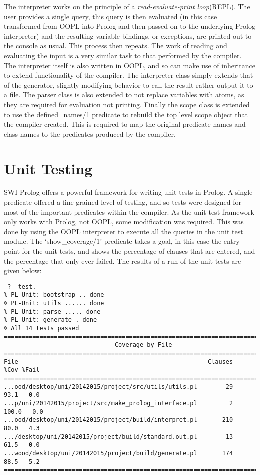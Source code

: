 \documentclass[12pt,a4paper,twoside,openright]{report}
\begin{document}
\bigskip

The interpreter works on the principle of a \emph{read-evaluate-print loop}(REPL). The user provides a single query, this query is then evaluated (in this case transformed from OOPL into Prolog and then passed on to the underlying Prolog interpreter) and the resulting variable bindings, or exceptions, are printed out to the console as usual. This process then repeats. The work of reading and evaluating the input is a very similar task to that performed by the compiler. The interpreter itself is also written in OOPL, and so can make use of inheritance to extend functionality of the compiler. The interpreter class simply extends that of the generator, slightly modifying behavior to call the result rather output it to a file. The parser class is also extended to not replace variables with atoms, as they are required for evaluation not printing. Finally the scope class is extended to use the defined_names/1 predicate to rebuild the top level scope object that the compiler created. This is required to map the original predicate names and class names to the predicates produced by the compiler.

\section{Unit Testing}

SWI-Prolog offers a powerful framework for writing unit tests in Prolog. A single predicate offered a fine-grained level of testing, and so tests were designed for most of the important predicates within the compiler. As the unit test framework only works with Prolog, not OOPL, some modification was required. This was done by using the OOPL interpreter to execute all the queries in the unit test module. The `show_coverage/1' predicate takes a goal, in this case the entry point for the unit tests, and shows the percentage of clauses that are entered, and the percentage that only ever failed. The results of a run of the unit tests are given below:
 
 \begin{verbatim}
 ?- test.
% PL-Unit: bootstrap .. done
% PL-Unit: utils ...... done
% PL-Unit: parse ..... done
% PL-Unit: generate . done
% All 14 tests passed
==============================================================================
                               Coverage by File                               
==============================================================================
File                                                     Clauses    %Cov %Fail
==============================================================================
...ood/desktop/uni/20142015/project/src/utils/utils.pl        29    93.1   0.0
...p/uni/20142015/project/src/make_prolog_interface.pl         2   100.0   0.0
...ood/desktop/uni/20142015/project/build/interpret.pl       210    80.0   4.3
.../desktop/uni/20142015/project/build/standard.out.pl        13    61.5   0.0
...wood/desktop/uni/20142015/project/build/generate.pl       174    88.5   5.2
==============================================================================
 \end{verbatim}
\end{document}
